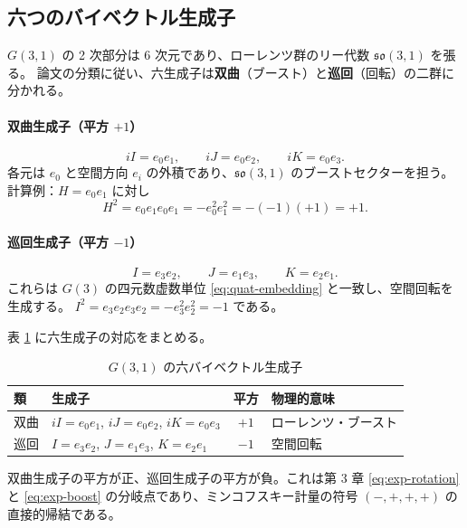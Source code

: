 \documentclass[dvipdfmx,a4paper,oneside]{jsbook}
\numberwithin{equation}{chapter}
\begin{document}
\subsection{六つのバイベクトル生成子}

\(G(3,1)\) の 2 次部分は 6 次元であり、ローレンツ群のリー代数 \(\mathfrak{so}(3,1)\) を張る。
論文の分類に従い、六生成子は\textbf{双曲}（ブースト）と\textbf{巡回}（回転）の二群に分かれる。

\paragraph{双曲生成子（平方 \(+1\)）}
\begin{equation}
  iI = e_0 e_1, \qquad iJ = e_0 e_2, \qquad iK = e_0 e_3.
  \label{eq:hyperbolic-biv}
\end{equation}
各元は \(e_0\) と空間方向 \(e_i\) の外積であり、\(\mathfrak{so}(3,1)\) のブーストセクターを担う。
計算例：\(H = e_0 e_1\) に対し
\[
H^2 = e_0 e_1 e_0 e_1 = -e_0^2 e_1^2 = -(-1)(+1) = +1.
\]

\paragraph{巡回生成子（平方 \(-1\)）}
\begin{equation}
  I = e_3 e_2, \qquad J = e_1 e_3, \qquad K = e_2 e_1.
  \label{eq:cyclic-biv}
\end{equation}
これらは \(G(3)\) の四元数虚数単位 \eqref{eq:quat-embedding} と一致し、空間回転を生成する。
\(I^2 = e_3 e_2 e_3 e_2 = -e_3^2 e_2^2 = -1\) である。

表 \ref{tab:so31-generators} に六生成子の対応をまとめる。

\begin{table}[htbp]
  \centering
  \caption{\(G(3,1)\) の六バイベクトル生成子}
  \label{tab:so31-generators}
  \begin{tabular}{@{}llcl@{}}
    \toprule
    類 & 生成子 & 平方 & 物理的意味 \\
    \midrule
    双曲 & \(iI = e_0 e_1\), \(iJ = e_0 e_2\), \(iK = e_0 e_3\) & \(+1\) & ローレンツ・ブースト \\
    巡回 & \(I = e_3 e_2\), \(J = e_1 e_3\), \(K = e_2 e_1\) & \(-1\) & 空間回転 \\
    \bottomrule
  \end{tabular}
\end{table}

双曲生成子の平方が正、巡回生成子の平方が負。これは第 3 章 \eqref{eq:exp-rotation} と \eqref{eq:exp-boost} の分岐点であり、ミンコフスキー計量の符号 \((-,+,+,+)\) の直接的帰結である。
\end{document}

